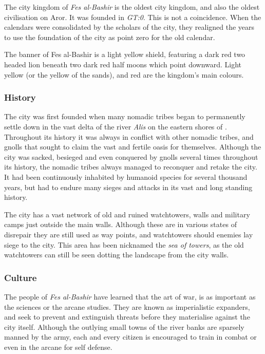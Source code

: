 The city kingdom of \emph{Fes al-Bashir} is the oldest city kingdom, and also
the oldest civilisation on Aror. It was founded in \emph{GT:0}. This is not a
coincidence. When the calendars were consolidated by the scholars of the city,
they realigned the years to use the foundation of the city as point zero for
the old calendar.

The banner of Fes al-Bashir is a light yellow shield, featuring a dark red two
headed lion beneath two dark red half moons which point downward. Light yellow
(or the yellow of the sands), and red are the kingdom's main colours.

\subsubsection{History}

The city was first founded when many nomadic tribes began to permanently
settle down in the vast delta of the river \emph{Alis} on the eastern shores
of . Throughout its history it was always in conflict with
other nomadic tribes, and gnolls that sought to claim the vast and fertile
oasis for themselves. Although the city was sacked, besieged and even
conquered by gnolls several times throughout its history, the nomadic tribes
always managed to reconquer and retake the city. It had been continuously
inhabited by humanoid species for several thousand years, but had to endure
many sieges and attacks in its vast and long standing history.

The city has a vast network of old and ruined watchtowers, walls and military
camps just outside the main walls. Although these are in various states of
disrepair they are still used as way points, and watchtowers should enemies
lay siege to the city. This area has been nicknamed the \emph{sea of towers},
as the old watchtowers can still be seen dotting the landscape from the city
walls.

\subsubsection{Culture}

The people of \emph{Fes al-Bashir} have learned that the art of war, is as
important as the sciences or the arcane studies. They are known as
imperialistic expanders, and seek to prevent and extinguish threats before
they materialise against the city itself. Although the outlying small towns of
the river banks are sparsely manned by the army, each and every citizen is
encouraged to train in combat or even in the arcane for self defense.

